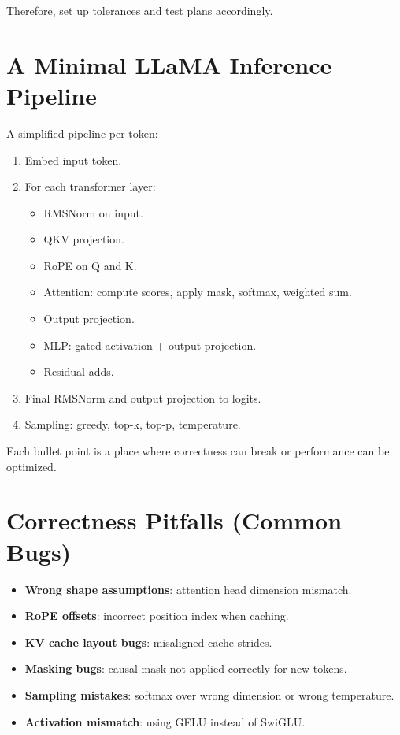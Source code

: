 \documentclass[11pt]{article}
\begin{document}
Therefore, set up tolerances and test plans accordingly.

\section{A Minimal LLaMA Inference Pipeline}
A simplified pipeline per token:
\begin{enumerate}
  \item Embed input token.
  \item For each transformer layer:
    \begin{itemize}
      \item RMSNorm on input.
      \item QKV projection.
      \item RoPE on Q and K.
      \item Attention: compute scores, apply mask, softmax, weighted sum.
      \item Output projection.
      \item MLP: gated activation + output projection.
      \item Residual adds.
    \end{itemize}
  \item Final RMSNorm and output projection to logits.
  \item Sampling: greedy, top-k, top-p, temperature.
\end{enumerate}

Each bullet point is a place where correctness can break or performance can be optimized.

\section{Correctness Pitfalls (Common Bugs)}
\begin{itemize}
  \item \textbf{Wrong shape assumptions}: attention head dimension mismatch.
  \item \textbf{RoPE offsets}: incorrect position index when caching.
  \item \textbf{KV cache layout bugs}: misaligned cache strides.
  \item \textbf{Masking bugs}: causal mask not applied correctly for new tokens.
  \item \textbf{Sampling mistakes}: softmax over wrong dimension or wrong temperature.
  \item \textbf{Activation mismatch}: using GELU instead of SwiGLU.
\end{itemize}
\end{document}
